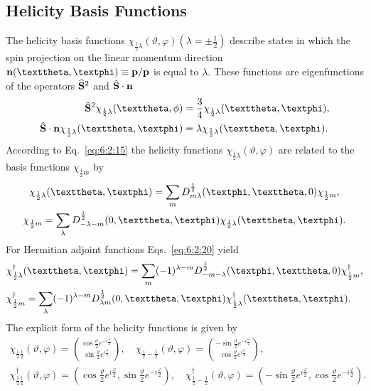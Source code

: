\subsection{Helicity Basis Functions}\label{sec:6.2.5}
The helicity basis functions $\chi_{\frac{1}{2} \lambda}(\vartheta, \varphi)\left(\lambda= \pm \frac{1}{2}\right)$ describe states in which the spin projection on the linear momentum direction $\vect{n}(\vartheta, \varphi) \equiv \vect{p} / \vect{p}$ is equal to $\lambda$. These functions are eigenfunctions of the operators $\widehat{\mathbf{S}}^{2}$ and $\hat{\mathbf{S}} \cdot \mathbf{n}$
\begin{align}
\hat{\vect{S}}^{2} \chi_{\frac{1}{2} \lambda}(\vartheta, \phi) & =\frac{3}{4} \chi_{\frac{1}{2} \lambda}(\vartheta, \varphi) , \label{eq:6:2:19}\\
\hat{\vect{S}} \cdot \vect{n} \chi_{\frac{1}{2} \lambda}(\vartheta, \varphi) & =\lambda \chi_{\frac{1}{2} \lambda}(\vartheta, \varphi). \notag
\end{align}
According to Eq.~\eqref{eq:6:2:15} the helicity functions $\chi_{\frac{1}{2} \lambda}(\vartheta, \varphi)$ are related to the basis functions $\chi_{\frac{1}{2} m}$ by
\begin{gather}
\chi_{\frac{1}{2} \lambda}(\vartheta, \varphi)=\sum_{m} D_{m \lambda}^{\frac{1}{2}}(\varphi, \vartheta, 0) \chi_{\frac{1}{2} m} , \notag\\
\chi_{\frac{1}{2} m}=\sum_{\lambda} D_{-\lambda-m}^{\frac{1}{2}}(0, \vartheta, \varphi) \chi_{\frac{1}{2} \lambda}(\vartheta, \varphi) . \label{eq:6:2:20}
\end{gather}
For Hermitian adjoint functions Eqs.~\eqref{eq:6:2:20} yield
\begin{align}
& \chi_{\frac{1}{2} \lambda}^{\dagger}(\vartheta, \varphi)=\sum_{m}(-1)^{\lambda-m} D_{-m-\lambda}^{\frac{1}{2}}(\varphi, \vartheta, 0) \chi_{\frac{1}{2} m}^{\dagger} , \notag\\
& \chi_{\frac{1}{2} m}^{\dagger}=\sum_{\lambda}(-1)^{\lambda-m} D_{\lambda m}^{\frac{1}{2}}(0, \vartheta, \varphi) \chi_{\frac{1}{2} \lambda}^{\dagger}(\vartheta, \varphi). \label{eq:6:2:21}
\end{align}
The explicit form of the helicity functions is given by
\begin{gather}
\chi_{\frac{1}{2} \frac{1}{2}}(\vartheta, \varphi)=\binom{\cos \frac{\vartheta}{2} e^{-i \frac{\varphi}{2}}}{\sin \frac{\vartheta}{2} e^{i \frac{\varphi}{2}}}, \quad \chi_{\frac{1}{2}-\frac{1}{2}}(\vartheta, \varphi)=\binom{-\sin \frac{\vartheta}{2} e^{-i \frac{\varphi}{2}}}{\cos \frac{\vartheta}{2} e^{i \frac{\varphi}{2}}}, \label{eq:6:2:22}\\
\chi_{\frac{1}{2} \frac{1}{2}}^{\dagger}(\vartheta, \varphi)=\left(\cos \frac{\vartheta}{2} e^{i \frac{\varphi}{2}}, \sin \frac{\vartheta}{2} e^{-i \frac{\varphi}{2}}\right), \quad \chi_{\frac{1}{2}-\frac{1}{2}}^{\dagger}(\vartheta, \varphi)=\left(-\sin \frac{\vartheta}{2} e^{i \frac{\varphi}{2}}, \cos \frac{\vartheta}{2} e^{-i \frac{\varphi}{2}}\right) . \label{eq:6:2:23}
\end{gather}
